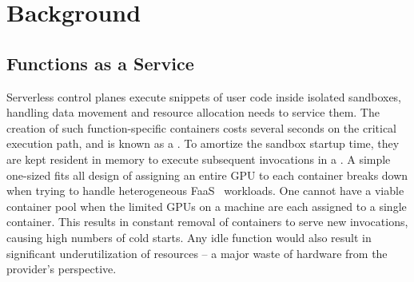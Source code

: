 \vspace*{\subsecspace}
\section{Background}
\vspace*{\subsecspace}
\label{sec:bg}

\subsection{Functions as a Service}

Serverless control planes execute snippets of user code inside isolated sandboxes, handling data movement and resource allocation needs to service them.
The creation of such function-specific containers costs several seconds on the critical execution path, and is known as a .
To amortize the sandbox startup time, they are kept resident in memory to execute subsequent invocations in a .
A simple one-sized fits all design of assigning an entire GPU to each container breaks down when trying to handle heterogeneous FaaS~\cite{shahrad2020serverless} workloads.
One cannot have a viable container pool when the limited GPUs on a machine are each assigned to a single container.
This results in constant removal of containers to serve new invocations, causing high numbers of cold starts.
Any idle function would also result in significant underutilization of resources -- a major waste of hardware from the provider's perspective.

